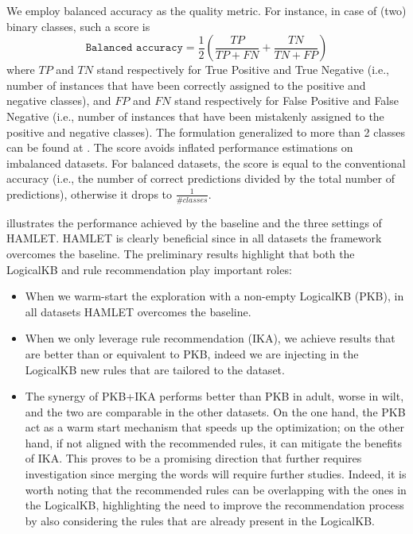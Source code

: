 We employ balanced accuracy as the quality metric.
For instance, in case of (two) binary classes, such a score is
$$
\texttt{Balanced accuracy} = \frac{1}{2}\left ( \frac{TP}{TP + FN} + \frac{TN}{TN + FP}\right )
$$
where $TP$ and $TN$ stand respectively for True Positive and True Negative (i.e., number of instances that have been correctly assigned to the positive and negative classes), and $FP$ and $FN$ stand respectively for False Positive and False Negative (i.e., number of instances that have been mistakenly assigned to the positive and negative classes). The formulation generalized to more than 2 classes can be found at \cite{DBLP:conf/icpr/BrodersenOSB10}.
The score avoids inflated performance estimations on imbalanced datasets.
For balanced datasets, the score is equal to the conventional accuracy (i.e., the number of correct predictions divided by the total number of predictions), otherwise it drops to $\frac{1}{\#classes}$.

 illustrates the performance achieved by the baseline and the three settings of HAMLET.
HAMLET is clearly beneficial since in all datasets the framework overcomes the baseline.
The preliminary results highlight that both the LogicalKB and rule recommendation play important roles:
\begin{itemize}
    \item When we warm-start the exploration with a non-empty LogicalKB (PKB), in all datasets HAMLET overcomes the baseline.
    \item When we only leverage rule recommendation (IKA), we achieve results that are better than or equivalent to PKB, indeed we are injecting in the LogicalKB new rules that are tailored to the dataset.
    \item The synergy of PKB+IKA performs better than PKB in adult, worse in wilt, and the two are comparable in the other datasets.
    On the one hand, the PKB act as a warm start mechanism that speeds up the optimization; on the other hand, if not aligned with the recommended rules, it can mitigate the benefits of IKA.
    This proves to be a promising direction that further requires investigation since merging the words will require further studies.
    Indeed, it is worth noting that the recommended rules can be overlapping with the ones in the LogicalKB, highlighting the need to improve the recommendation process by also considering the rules that are already present in the LogicalKB.
\end{itemize}

